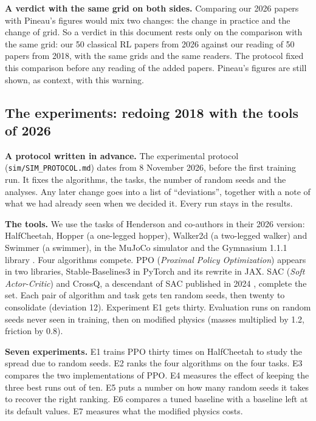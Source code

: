 \documentclass[11pt,a4paper]{article}
\begin{document}
\textbf{A verdict with the same grid on both sides.} Comparing our 2026
papers with Pineau's figures would mix two changes: the change in
practice and the change of grid. So a verdict in this document rests
only on the comparison with the same grid: our 50 classical RL papers
from 2026 against our reading of 50 papers from 2018, with the same
grids and the same readers. The protocol fixed this comparison before
any reading of the added papers. Pineau's figures are still shown, as
context, with this warning.

\subsection{The experiments: redoing 2018 with the tools of
2026}\label{the-experiments-redoing-2018-with-the-tools-of-2026}

\textbf{A protocol written in advance.} The experimental protocol
(\texttt{sim/SIM\_PROTOCOL.md}) dates from 8 November 2026, before the
first training run. It fixes the algorithms, the tasks, the number of
random seeds and the analyses. Any later change goes into a list of
``deviations'', together with a note of what we had already seen when we
decided it. Every run stays in the results.

\textbf{The tools.} We use the tasks of Henderson and co-authors in
their 2026 version: HalfCheetah, Hopper (a one-legged hopper), Walker2d
(a two-legged walker) and Swimmer (a swimmer), in the MuJoCo simulator
and the Gymnasium 1.1.1 library \autocite{towers2024gymnasium}. Four
algorithms compete. PPO (\emph{Proximal Policy Optimization})
\autocite{schulman2017ppo} appears in two libraries, Stable-Baselines3
in PyTorch \autocite{raffin2021sb3} and its rewrite in JAX. SAC
(\emph{Soft Actor-Critic}) \autocite{haarnoja2018sac} and CrossQ, a
descendant of SAC published in 2024 \autocite{bhatt2024crossq}, complete
the set. Each pair of algorithm and task gets ten random seeds, then
twenty to consolidate (deviation 12). Experiment E1 gets thirty.
Evaluation runs on random seeds never seen in training, then on modified
physics (masses multiplied by 1.2, friction by 0.8).

\textbf{Seven experiments.} E1 trains PPO thirty times on HalfCheetah to
study the spread due to random seeds. E2 ranks the four algorithms on
the four tasks. E3 compares the two implementations of PPO. E4 measures
the effect of keeping the three best runs out of ten. E5 puts a number
on how many random seeds it takes to recover the right ranking. E6
compares a tuned baseline with a baseline left at its default values. E7
measures what the modified physics costs.
\end{document}
